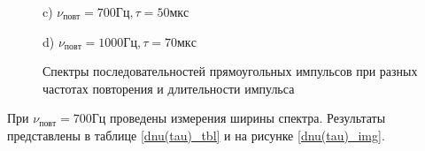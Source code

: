 \documentclass[a4paper,12pt]{article} %
\begin{document}
\begin{figure}[h!]
\begin{minipage}[h!]{0.47\linewidth}
 c) $\nu_{повт} = 700 Гц, \tau = 50 мкс$ \\
\end{minipage}
\hfill
\begin{minipage}[h!]{0.47\linewidth}
 d) $\nu_{повт} = 1000 Гц, \tau = 70 мкс$ \\
\end{minipage}
\caption{Спектры последовательностей прямоугольных импульсов при разных частотах повторения и длительности импульса}
\label{прямоуг}
\end{figure}
При $\nu_{повт} = 700 Гц$ проведены измерения ширины спектра. Результаты 
представлены в таблице \ref{dnu(tau)_tbl} и на рисунке \ref{dnu(tau)_img}.
\end{document}

